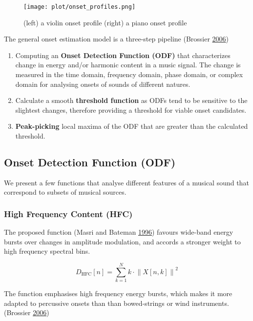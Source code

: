 \documentclass[american,]{article}
\providecommand{\tightlist}{%
  \setlength{\itemsep}{0pt}\setlength{\parskip}{0pt}}
\begin{document}
\begin{figure}
\centering
\texttt{[image: plot/onset\_profiles.png]}
\caption{(left) a violin onset profile (right) a piano onset profile}
\end{figure}

The general onset estimation model is a three-step pipeline (Brossier \protect\hyperlink{ref-brossier}{2006})

\begin{enumerate}
\def\labelenumi{\arabic{enumi}.}
\tightlist
\item
  Computing an \textbf{Onset Detection Function (ODF)} that
  characterizes change in energy and/or harmonic content
  in a music signal.
  The change is measured in the time domain, frequency domain,
  phase domain, or complex domain for analysing onsets
  of sounds of different natures.
\item
  Calculate a smooth \textbf{threshold function} as ODFs
  tend to be sensitive to the slightest changes, therefore
  providing a threshold for viable onset candidates.
\item
  \textbf{Peak-picking} local maxima of the ODF that are
  greater than the calculated threshold.
\end{enumerate}

\hypertarget{onset-detection-function-odf}{%
\subsection{Onset Detection Function (ODF)}\label{onset-detection-function-odf}}

We present a few functions that analyse different features
of a musical sound that correspond to subsets of musical sources.

\hypertarget{high-frequency-content-hfc}{%
\subsubsection{High Frequency Content (HFC)}\label{high-frequency-content-hfc}}

The proposed function (Masri and Bateman \protect\hyperlink{ref-hfc}{1996}) favours wide-band energy bursts
over changes in amplitude modulation, and accords a stronger weight
to high frequency spectral bins.

\[D_{\text{HFC}}[n] = \sum\limits_{k=1}^{N}
    k\cdot\left\lVert X[n,k]\right\rVert^2\]

The function emphasises high frequency energy bursts,
which makes it more adapted to percussive onsets than
than bowed-strings or wind instruments. (Brossier \protect\hyperlink{ref-brossier}{2006})
\end{document}
